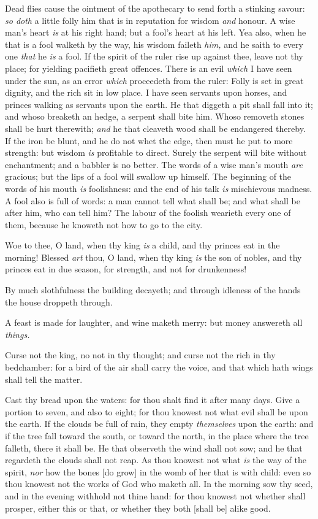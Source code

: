 \documentclass[11pt,letterpaper,oneside]{memoir}
\begin{document}
Dead flies cause the ointment of the apothecary to send forth a stinking 
savour: \emph{so doth} a little folly him that is in reputation for 
wisdom \emph{and} honour. A wise man's heart \emph{is} at his right 
hand; but a fool's heart at his left. Yea also, when he that is a fool 
walketh by the way, his wisdom faileth \emph{him,} and he saith to every 
one \emph{that} he \emph{is} a fool. If the spirit of the ruler rise up 
against thee, leave not thy place; for yielding pacifieth great 
offences. There is an evil \emph{which} I have seen under the sun, as an 
error \emph{which} proceedeth from the ruler: Folly is set in great 
dignity, and the rich sit in low place. I have seen servants upon 
horses, and princes walking as servants upon the earth. He that diggeth 
a pit shall fall into it; and whoso breaketh an hedge, a serpent shall 
bite him. Whoso removeth stones shall be hurt therewith; \emph{and} he 
that cleaveth wood shall be endangered thereby. If the iron be blunt, 
and he do not whet the edge, then must he put to more strength: but 
wisdom \emph{is} profitable to direct. Surely the serpent will bite 
without enchantment; and a babbler is no better. The words of a wise 
man's mouth \emph{are} gracious; but the lips of a fool will swallow up 
himself. The beginning of the words of his mouth \emph{is} foolishness: 
and the end of his talk \emph{is} mischievous madness. A fool also is 
full of words: a man cannot tell what shall be; and what shall be after 
him, who can tell him? The labour of the foolish wearieth every one of 
them, because he knoweth not how to go to the city. 

Woe to thee, O land, when thy king \emph{is} a child, and thy princes 
eat in the morning! Blessed \emph{art} thou, O land, when thy king 
\emph{is} the son of nobles, and thy princes eat in due season, for 
strength, and not for drunkenness! 

By much slothfulness the building decayeth; and through idleness of the 
hands the house droppeth through. 

A feast is made for laughter, and wine maketh merry: but money answereth 
all \emph{things.} 

Curse not the king, no not in thy thought; and curse not the rich in thy 
bedchamber: for a bird of the air shall carry the voice, and that which 
hath wings shall tell the matter. 

Cast thy bread upon the waters: for thou shalt find it after many days. 
Give a portion to seven, and also to eight; for thou knowest not what 
evil shall be upon the earth. If the clouds be full of rain, they empty 
\emph{themselves} upon the earth: and if the tree fall toward the south, 
or toward the north, in the place where the tree falleth, there it shall 
be. He that observeth the wind shall not sow; and he that regardeth the 
clouds shall not reap. As thou knowest not what \emph{is} the way of the 
spirit, \emph{nor} how the bones [do grow] in the womb of her that is 
with child: even so thou knowest not the works of God who maketh all. In 
the morning sow thy seed, and in the evening withhold not thine hand: 
for thou knowest not whether shall prosper, either this or that, or 
whether they both [shall be] alike good. 
\end{document}
